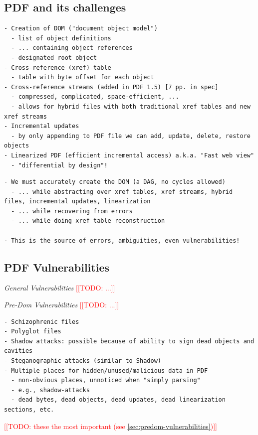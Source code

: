 \documentclass[conference,12pt]{IEEEtran}
\newcommand{\note}[1]{\noteYes{#1}}
\newcommand{\noteYes}[1]{\textcolor{red}{[[#1]]}}
\newcommand{\todo}[1]{\note{TODO: #1}}
\begin{document}
\subsection{PDF and its challenges}
\label{sec:pdf-challenges}

\begin{lstlisting}[style=meta]
- Creation of DOM ("document object model")
  - list of object definitions
  - ... containing object references
  - designated root object
- Cross-reference (xref) table
  - table with byte offset for each object
- Cross-reference streams (added in PDF 1.5) [7 pp. in spec]
  - compressed, complicated, space-efficient, ...
  - allows for hybrid files with both traditional xref tables and new xref streams
- Incremental updates
  - by only appending to PDF file we can add, update, delete, restore objects
- Linearized PDF (efficient incremental access) a.k.a. "Fast web view"
  - "differential by design"!
\end{lstlisting}

\begin{lstlisting}[style=meta]
- We must accurately create the DOM (a DAG, no cycles allowed)
  - ... while abstracting over xref tables, xref streams, hybrid files, incremental updates, linearization
  - ... while recovering from errors
  - ... while doing xref table reconstruction

- This is the source of errors, ambiguities, even vulnerabilities!
\end{lstlisting}

\subsection{PDF Vulnerabilities}

\emph{General Vulnerabilities} \todo{...}

\emph{Pre-Dom Vulnerabilities} \todo{...}

\begin{lstlisting}[style=meta]
- Schizophrenic files
- Polyglot files
- Shadow attacks: possible because of ability to sign dead objects and cavities
- Steganographic attacks (similar to Shadow)
- Multiple places for hidden/unused/malicious data in PDF
  - non-obvious places, unnoticed when "simply parsing"
  - e.g., shadow-attacks
  - dead bytes, dead objects, dead updates, dead linearization sections, etc.
\end{lstlisting}

\todo{these the most important (see \cref{sec:predom-vulnerabilities})}
\end{document}
